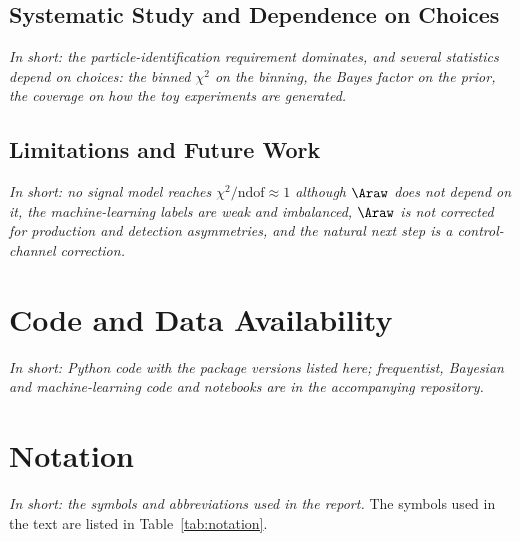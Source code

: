 \subsection{Systematic Study and Dependence on Choices}
\emph{In short: the particle-identification requirement dominates, and several statistics depend on choices: the binned $\chi^2$ on the binning, the Bayes factor on the prior, the coverage on how the toy experiments are generated.}

\subsection{Limitations and Future Work}
\label{sec:limitations}
\emph{In short: no signal model reaches $\chi^2/\mathrm{ndof}\approx1$ although $\Araw$ does not depend on it, the machine-learning labels are weak and imbalanced, $\Araw$ is not corrected for production and detection asymmetries, and the natural next step is a control-channel correction.}

\FloatBarrier

\section{Code and Data Availability}
\label{sec:code}
\emph{In short: Python code with the package versions listed here; frequentist, Bayesian and machine-learning code and notebooks are in the accompanying repository.}

\FloatBarrier

\section{Notation}
\label{sec:notation}
\emph{In short: the symbols and abbreviations used in the report.}
The symbols used in the text are listed in Table~\ref{tab:notation}.

